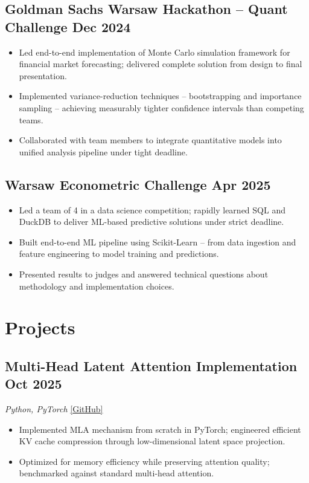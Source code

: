\documentclass[11pt]{article}
\begin{document}
\subsection{Goldman Sachs Warsaw Hackathon -- Quant Challenge \hfill Dec 2024}
\begin{itemize}
    \item Led end-to-end implementation of Monte Carlo simulation framework for financial market forecasting; delivered complete solution from design to final presentation.
    \item Implemented variance-reduction techniques -- bootstrapping and importance sampling -- achieving measurably tighter confidence intervals than competing teams.
    \item Collaborated with team members to integrate quantitative models into unified analysis pipeline under tight deadline.
\end{itemize}

\subsection{Warsaw Econometric Challenge \hfill Apr 2025}
\begin{itemize}
    \item Led a team of 4 in a data science competition; rapidly learned SQL and DuckDB to deliver ML-based predictive solutions under strict deadline.
    \item Built end-to-end ML pipeline using Scikit-Learn -- from data ingestion and feature engineering to model training and predictions.
    \item Presented results to judges and answered technical questions about methodology and implementation choices.
\end{itemize}

\section{Projects}

\subsection{Multi-Head Latent Attention Implementation \hfill Oct 2025}
\textit{Python, PyTorch} \quad \href{https://github.com/illyayurchanka/nanodeepsk}{\small[GitHub]}
\begin{itemize}
    \item Implemented MLA mechanism from scratch in PyTorch; engineered efficient KV cache compression through low-dimensional latent space projection.
    \item Optimized for memory efficiency while preserving attention quality; benchmarked against standard multi-head attention.
\end{itemize}
\end{document}
